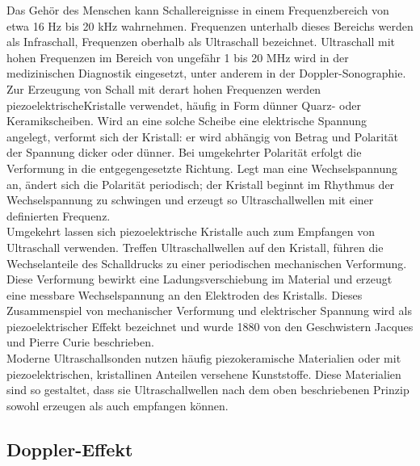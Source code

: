 \documentclass[
	german,%
	accentcolor=3d,%
	type=intern, %
	marginpar=false,%
]{tudapub}
\begin{document}
      Das Gehör des Menschen kann Schallereignisse in einem Frequenzbereich von etwa 16 Hz bis 20 kHz wahrnehmen. Frequenzen unterhalb dieses Bereichs werden als Infraschall, Frequenzen oberhalb als Ultraschall bezeichnet. Ultraschall mit hohen Frequenzen im Bereich von ungefähr 1 bis 20 MHz wird in der medizinischen Diagnostik eingesetzt, unter anderem in der Doppler-Sonographie. Zur Erzeugung von Schall mit derart hohen Frequenzen werden piezoelektrischeKristalle verwendet, häufig in Form dünner Quarz- oder Keramikscheiben. Wird an eine solche Scheibe eine elektrische Spannung angelegt, verformt sich der Kristall: er wird abhängig von Betrag und Polarität der Spannung dicker oder dünner. Bei umgekehrter Polarität erfolgt die Verformung in die entgegengesetzte Richtung. Legt man eine Wechselspannung an, ändert sich die Polarität periodisch; der Kristall beginnt im Rhythmus der Wechselspannung zu schwingen und erzeugt so Ultraschallwellen mit einer definierten Frequenz.
      \\
      Umgekehrt lassen sich piezoelektrische Kristalle auch zum Empfangen von Ultraschall verwenden. Treffen Ultraschallwellen auf den Kristall, führen die Wechselanteile des Schalldrucks zu einer periodischen mechanischen Verformung. Diese Verformung bewirkt eine Ladungsverschiebung im Material und erzeugt eine messbare Wechselspannung an den Elektroden des Kristalls. Dieses Zusammenspiel von mechanischer Verformung und elektrischer Spannung wird als piezoelektrischer Effekt bezeichnet und wurde 1880 von den Geschwistern Jacques und Pierre Curie beschrieben.\\
      Moderne Ultraschallsonden nutzen häufig piezokeramische Materialien oder mit piezoelektrischen, kristallinen Anteilen versehene Kunststoffe. Diese Materialien sind so gestaltet, dass sie Ultraschallwellen nach dem oben beschriebenen Prinzip sowohl erzeugen als auch empfangen können.


   \subsection{Doppler-Effekt}\label{sec:doppler}
\end{document}

